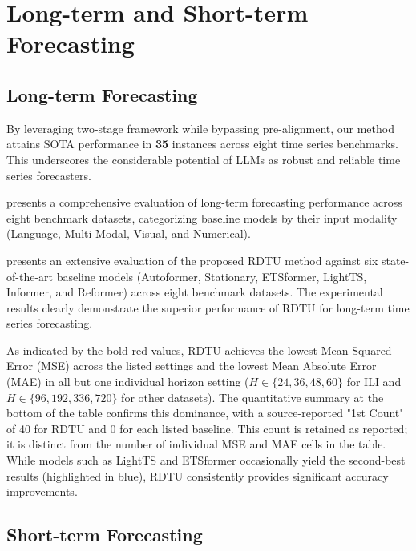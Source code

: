 
\section{Long-term and Short-term Forecasting}\label{appx:long-short-term}

\subsection{Long-term Forecasting}

By leveraging two-stage \method{} framework while bypassing pre-alignment, our method attains SOTA performance in \textbf{35} instances across eight time series benchmarks. This underscores the considerable potential of LLMs as robust and reliable time series forecasters.

 presents a comprehensive evaluation of long-term forecasting performance across eight benchmark datasets, categorizing baseline models by their input modality (Language, Multi-Modal, Visual, and Numerical).






 presents an extensive evaluation of the proposed RDTU method against six state-of-the-art baseline models (Autoformer, Stationary, ETSformer, LightTS, Informer, and Reformer) across eight benchmark datasets. The experimental results clearly demonstrate the superior performance of RDTU for long-term time series forecasting.

As indicated by the bold red values, RDTU achieves the lowest Mean Squared Error (MSE) across the listed settings and the lowest Mean Absolute Error (MAE) in all but one individual horizon setting ($H \in \{24, 36, 48, 60\}$ for ILI and $H \in \{96, 192, 336, 720\}$ for other datasets). The quantitative summary at the bottom of the table confirms this dominance, with a source-reported "1st Count" of 40 for RDTU and 0 for each listed baseline. This count is retained as reported; it is distinct from the number of individual MSE and MAE cells in the table. While models such as LightTS and ETSformer occasionally yield the second-best results (highlighted in blue), RDTU consistently provides significant accuracy improvements.


\subsection{Short-term Forecasting}

